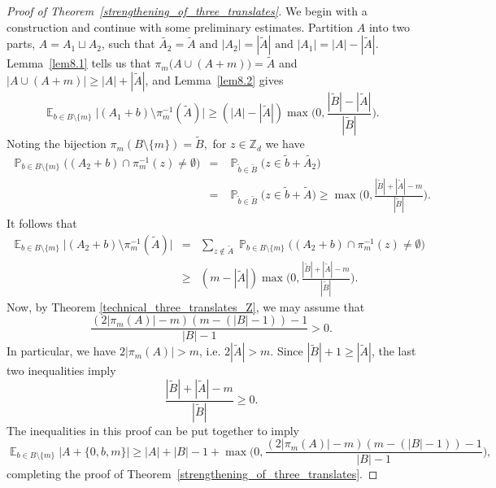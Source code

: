\documentclass[12pt,reqno]{amsart}
\DeclareMathOperator*{\E}{\mathbb{E}}
\DeclareMathOperator*{\Prob}{\mathbb{P}}
\theoremstyle{definition}
\renewcommand\geq{\geqslant}
\begin{document}
\begin{proof}[Proof of Theorem~\ref{strengthening_of_three_translates}]

We begin with a construction and continue with some preliminary estimates. Partition $A$ into two parts,
$A=A_1\sqcup A_2 $,
such that
$\widetilde{A_2}=\widetilde{A} \text{ and }  |A_2|=|\widetilde{A}| \text{ and } |A_1|=|A|-|\widetilde{A}|.$
Lemma~\ref{lem8.1} tells us that $\pi_m\bigg(A\cup (A+m)\bigg)= \widetilde{A}$
and $\bigg|A\cup (A+m) \bigg| \geq |A|+|\widetilde{A}|$, and Lemma~\ref{lem8.2} gives
\[
\E_{b\in B \setminus \{m\}} \bigg|(A_1+b) \setminus \pi_m^{-1}(\widetilde{A})\bigg| \geq
(|A|-|\widetilde{A}|) \max\bigg(0,\frac{|\widetilde{B}|-|\widetilde{A}|}{|\widetilde{B}|}\bigg).
\]
Noting the bijection $\pi_m(B\setminus\{m\})=\widetilde{B},$
for $z \in \mathbb{Z}_d$ we have
\begin{eqnarray*}
    \Prob_{b \in B \setminus\{m\}}\bigg((A_2 +b) \cap \pi_m^{-1}(z)  \neq \emptyset \bigg)
    &=&\Prob_{\widetilde{b} \in \widetilde{B}}\bigg(z \in \widetilde{b}+\widetilde{A_2}\bigg)\\
    &=&\Prob_{\widetilde{b} \in \widetilde{B}}\bigg(z \in \widetilde{b}+\widetilde{A}\bigg)
    \geq \max\bigg(0,\frac{|\widetilde{B}| + |\widetilde{A}|-m}{|\widetilde{B}|}\bigg).
\end{eqnarray*}
It follows that
\begin{eqnarray*}
\E_{b \in B \setminus\{m\}}\bigg|(A_2 +b) \setminus \pi_m^{-1}(\widetilde{A})\bigg|
&=& \sum_{z\not\in \widetilde{A}}\Prob_{b \in B \setminus\{m\}}\bigg((A_2 +b) \cap \pi_m^{-1}(z)
\neq \emptyset \bigg)\\
    &\geq& (m-|\widetilde{A}|)\max\bigg(0,\frac{|\widetilde{B}| + |\widetilde{A}|-m}{|\widetilde{B}|}\bigg).
\end{eqnarray*}
Now, by Theorem \ref{technical_three_translates_Z},  we may assume that
\begin{equation*}
  \frac{(2|\pi_m(A)|-m)(m-(|B|-1))-1}{|B|-1}  > 0.
\end{equation*}
In particular, we have $2|\pi_m(A)|>m$, i.e.  $2|\widetilde{A}|>m$.
Since $|\widetilde{B}|+1\geq |\widetilde{A}|$, the last two
inequalities imply
\[
\frac{|\widetilde{B}| + |\widetilde{A}|-m}{|\widetilde{B}|} \geq 0.
\]
The inequalities in this proof can be put together to imply\[
\E_{b\in B \setminus \{m\}}\bigg|A+\{0,b,m\}\bigg|
      \geq |A|+|B|-1+\max\bigg(0,\frac{(2|\pi_m(A)|-m)(m-(|B|-1))-1}{|B|-1} \bigg),
\]
completing the proof of Theorem~\ref{strengthening_of_three_translates}.
\end{proof}
\end{document}
